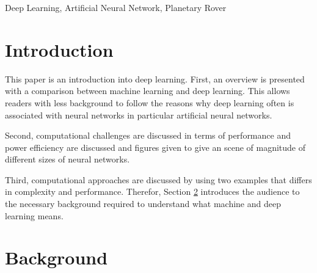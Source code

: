 \documentclass[conference]{IEEEtran}
\begin{document}
\begin{IEEEkeywords}
Deep Learning, Artificial Neural Network, Planetary Rover
\end{IEEEkeywords}

\section{Introduction}
This paper is an introduction into deep learning. 
First, an overview is presented with a comparison between machine learning and deep learning. 
This allows readers with less background to follow the reasons why deep learning often is associated with neural networks in particular artificial neural networks. 

Second, computational challenges are discussed in terms of performance and power efficiency are discussed and figures given to give an scene of magnitude of different sizes of neural networks.

Third, computational approaches are discussed by using two examples that differs in complexity and performance.
Therefor, Section \ref{sec: Background} introduces the audience to the necessary background required to understand what machine and deep learning means.
%
\section{Background}\label{sec: Background}
\end{document}
